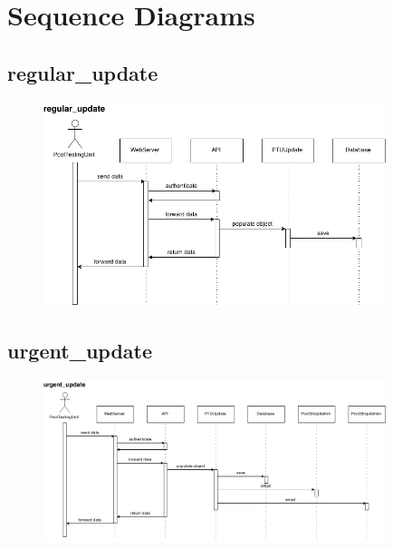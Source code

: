 \section{Sequence Diagrams}

\subsection{regular\_update}
\begin{figure}[!ht]
\begin{center}
	\includegraphics[width=10cm]{images/regular_update}
	\caption{}
\end{center}
\end{figure}

\FloatBarrier
\subsection{urgent\_update}
\begin{figure}[!ht]
\begin{center}
	\includegraphics[width=10cm]{images/urgent_update}
	\caption{}
\end{center}
\end{figure}

\FloatBarrier
